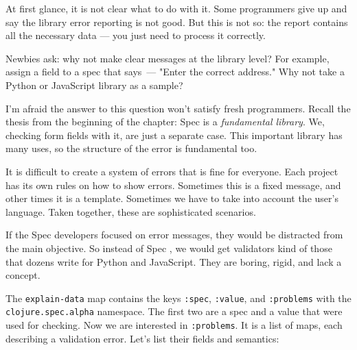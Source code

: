 
At first glance, it is not clear what to do with it. Some programmers give up and say the library error reporting is not good. But this is not so: the report contains all the necessary data — you just need to process it correctly.

Newbies ask: why not make clear messages at the library level? For example, assign a field to a spec that says~--- "Enter the correct address." Why not take a Python or JavaScript library as a sample?


I'm afraid the answer to this question won't satisfy fresh programmers. Recall the thesis from the beginning of the chapter: Spec is a \emph{fundamental library}. We, checking form fields with it, are just a separate case. This important library has many uses, so the structure of the error is fundamental too.

It is difficult to create a system of errors that is fine for everyone. Each project has its own rules on how to show errors. Sometimes this is a fixed message, and other times it is a template. Sometimes we have to take into account the user's language. Taken together, these are sophisticated scenarios.

If the Spec developers focused on error messages, they would be distracted from the main objective. So instead of Spec , we would get validators kind of those that dozens write for Python and JavaScript. They are boring, rigid, and lack a concept.

The \verb|explain-data| map contains the keys \verb|:spec|, \verb|:value|, and \verb|:problems| with the \verb|clojure.spec.alpha| namespace. The first two are a spec and a value that were used for checking. Now we are interested in \verb|:problems|. It is a list of maps, each describing a validation error. Let's list their fields and semantics:


